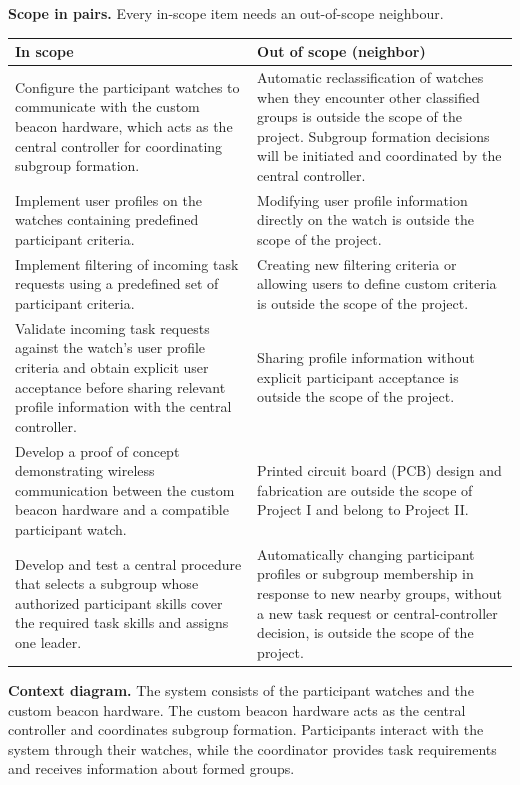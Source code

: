 \documentclass[10pt]{article}
\begin{document}
\textbf{Scope in pairs.} Every in-scope item needs an out-of-scope neighbour.
\begin{center}
\begin{tabularx}{\linewidth}{@{}X X@{}}
\toprule
\textbf{In scope} & \textbf{Out of scope (neighbor)}\\
\midrule
Configure the participant watches to communicate with the custom beacon hardware, which acts as the central controller for coordinating subgroup formation. & Automatic reclassification of watches when they encounter other classified groups is outside the scope of the project. Subgroup formation decisions will be initiated and coordinated by the central controller.\\
Implement user profiles on the watches containing predefined participant criteria. & Modifying user profile information directly on the watch is outside the scope of the project.\\
Implement filtering of incoming task requests using a predefined set of participant criteria. & Creating new filtering criteria or allowing users to define custom criteria is outside the scope of the project.\\
Validate incoming task requests against the watch’s user profile criteria and obtain explicit user acceptance before sharing relevant profile information with the central controller. & Sharing profile information without explicit participant acceptance is outside the scope of the project.\\
Develop a proof of concept demonstrating wireless communication between the custom beacon hardware and a compatible participant watch. & Printed circuit board (PCB) design and fabrication are outside the scope of Project I and belong to Project II.\\
Develop and test a central procedure that selects a subgroup whose authorized participant skills cover the required task skills and assigns one leader. & Automatically changing participant profiles or subgroup membership in response to new nearby groups, without a new task request or central-controller decision, is outside the scope of the project.\\
\bottomrule
\end{tabularx}
\end{center}

\textbf{Context diagram.}
The system consists of the participant watches and the custom beacon hardware. The custom beacon hardware acts as the central controller and coordinates subgroup formation. Participants interact with the system through their watches, while the coordinator provides task requirements and receives information about formed groups.
\end{document}
